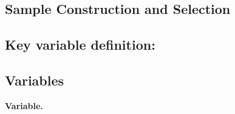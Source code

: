 \subsection{Sample Construction and Selection}

\subsection{Key variable definition:}

\subsection{Variables} \label{subsec:variables}

\textbf{Variable.} 
